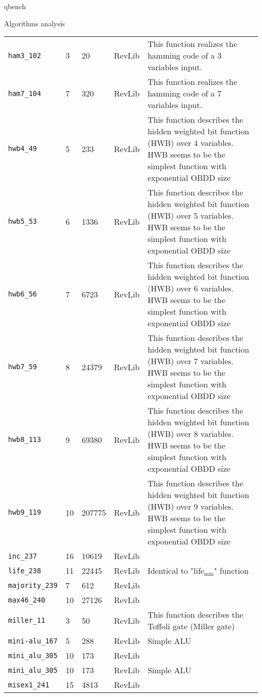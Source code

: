\documentclass[11pt]{beamer}
\begin{document}
\begin{frame}[fragile,label={sec:org639c711}]{qbench}
\begin{block}{Algorithms analysis}
\begin{table}[htbp]
\begin{tabular}{|p{3cm}|p{1.5cm}|p{1cm}|p{1cm}|p{7.5cm}|}
\texttt{ham3\_102} & 3 & 20 & RevLib & This function realizes the hamming code of a 3 variables input.\\
\texttt{ham7\_104} & 7 & 320 & RevLib & This function realizes the hamming code of a 7 variables input.\\
\texttt{hwb4\_49} & 5 & 233 & RevLib & This function describes the hidden weighted bit function (HWB) over 4 variables. HWB seems to be the simplest function with exponential OBDD size \cite{Bollig_1999}\\
\texttt{hwb5\_53} & 6 & 1336 & RevLib & This function describes the hidden weighted bit function (HWB) over 5 variables. HWB seems to be the simplest function with exponential OBDD size \cite{Bollig_1999}\\
\texttt{hwb6\_56} & 7 & 6723 & RevLib & This function describes the hidden weighted bit function (HWB) over 6 variables. HWB seems to be the simplest function with exponential OBDD size \cite{Bollig_1999}\\
\texttt{hwb7\_59} & 8 & 24379 & RevLib & This function describes the hidden weighted bit function (HWB) over 7 variables. HWB seems to be the simplest function with exponential OBDD size \cite{Bollig_1999}\\
\texttt{hwb8\_113} & 9 & 69380 & RevLib & This function describes the hidden weighted bit function (HWB) over 8 variables. HWB seems to be the simplest function with exponential OBDD size \cite{Bollig_1999}\\
\texttt{hwb9\_119} & 10 & 207775 & RevLib & This function describes the hidden weighted bit function (HWB) over 9 variables. HWB seems to be the simplest function with exponential OBDD size \cite{Bollig_1999}\\
\texttt{inc\_237} & 16 & 10619 & RevLib & \\
\texttt{life\_238} & 11 & 22445 & RevLib & Identical to "life\(_{\text{min}}\)" function\\
\texttt{majority\_239} & 7 & 612 & RevLib & \\
\texttt{max46\_240} & 10 & 27126 & RevLib & \\
\texttt{miller\_11} & 3 & 50 & RevLib & This function describes the Toffoli gate (Miller gate)\\
\texttt{mini-alu\_167} & 5 & 288 & RevLib & Simple ALU\\
\texttt{mini\_alu\_305} & 10 & 173 & RevLib & \\
\texttt{mini\_alu\_305} & 10 & 173 & RevLib & Simple ALU\\
\texttt{misex1\_241} & 15 & 4813 & RevLib & \\

\end{tabular}
\end{table}
\end{block}
\end{frame}
\end{document}
